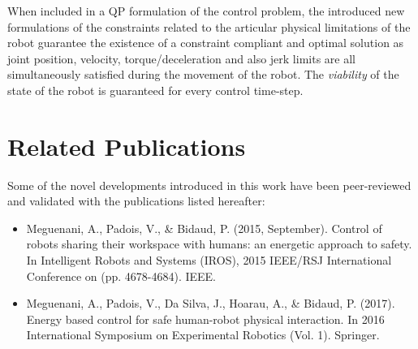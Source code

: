 When included in a QP formulation of the control problem, the introduced new formulations of the constraints related to the articular physical limitations of the robot guarantee the existence of a constraint compliant and optimal solution as joint position, velocity, \allowbreak torque/deceleration and also jerk limits are all simultaneously satisfied during the movement of the robot. The \textit{viability} of the state of the robot is guaranteed for every control time-step.
\section{Related Publications}
Some of the novel developments introduced in this work have been peer-reviewed and validated with the publications listed hereafter:
\begin{itemize}
\item Meguenani, A., Padois, V., \& Bidaud, P. (2015, September). Control of robots sharing their workspace with humans: an energetic approach to safety. In Intelligent Robots and Systems (IROS), 2015 IEEE/RSJ International Conference on (pp. 4678-4684). IEEE.
\item Meguenani, A., Padois, V., Da Silva, J., Hoarau, A., \& Bidaud, P. (2017). Energy based control for safe human-robot physical interaction. In 2016 International Symposium on Experimental Robotics (Vol. 1). Springer.
\end{itemize}























